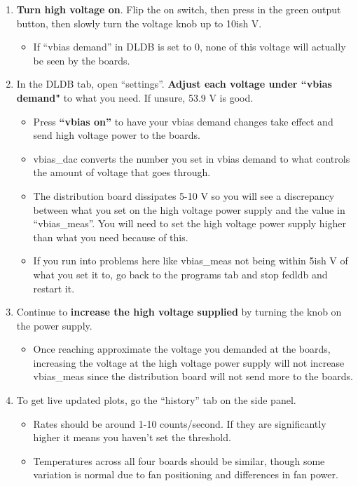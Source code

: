 \documentclass{article}
\begin{document}
\begin{enumerate}
    \item \textbf{Turn high voltage on}. Flip the on switch, then press in the green output button, then slowly turn the voltage knob up to 10ish V. 
    \begin{itemize}
        \item If “vbias demand” in DLDB is set to 0, none of this voltage will actually be seen by the boards.
    \end{itemize}
    \item In the DLDB tab, open “settings”. \textbf{Adjust each voltage under ``vbias demand"} to what you need. If unsure, 53.9 V is good. 
    \begin{itemize}
        \item Press \textbf{“vbias on”} to have your vbias demand changes take effect and send high voltage power to the boards.
        \item vbias\_dac converts the number you set in vbias demand to what controls the amount of voltage that goes through.
        \item The distribution board dissipates 5-10 V so you will see a discrepancy between what you set on the high voltage power supply and the value in “vbias\_meas”. You will need to set the high voltage power supply higher than what you need because of this.
        \item If you run into problems here like vbias\_meas not being within 5ish V of what you set it to, go back to the programs tab and stop fedldb and restart it.
    \end{itemize}
    \item Continue to \textbf{increase the high voltage supplied} by turning the knob on the power supply.
    \begin{itemize}
        \item Once reaching approximate the voltage you demanded at the boards, increasing the voltage at the high voltage power supply will not increase vbias\_meas since the distribution board will not send more to the boards.
    \end{itemize}
    \item To get live updated plots, go the “history” tab on the side panel.
    \begin{itemize}
        \item Rates should be around 1-10 counts/second. If they are significantly higher it means you haven’t set the threshold.
        \item Temperatures across all four boards should be similar, though some variation is normal due to fan positioning and differences in fan power.

\end{itemize}
\end{enumerate}
\end{document}
